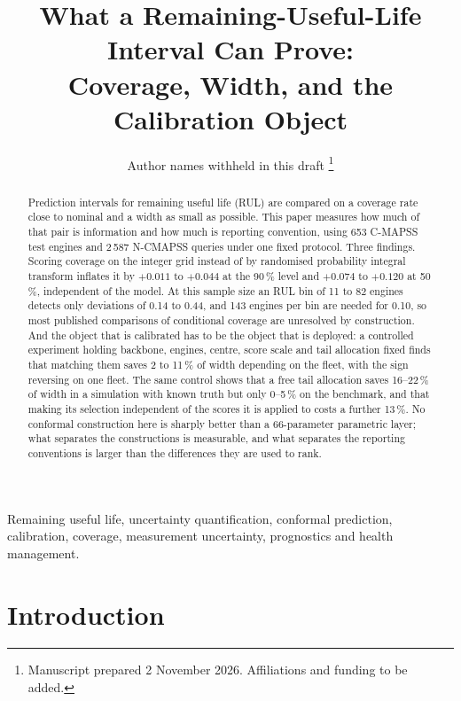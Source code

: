 \documentclass[journal]{IEEEtran}
\begin{document}
\title{What a Remaining-Useful-Life Interval Can Prove:\\ Coverage, Width, and the Calibration Object}

\author{Author names withheld in this draft%
\thanks{Manuscript prepared 2 November 2026. Affiliations and funding to be added.}}

\maketitle

\begin{abstract}
Prediction intervals for remaining useful life (RUL) are compared on a coverage rate close
to nominal and a width as small as possible. This paper measures how much of that pair is
information and how much is reporting convention, using 653 C-MAPSS test engines and 2\,587
N-CMAPSS queries under one fixed protocol. Three findings. Scoring coverage on the integer
grid instead of by randomised probability integral transform inflates it by $+0.011$ to
$+0.044$ at the 90\,\% level and $+0.074$ to $+0.120$ at 50\,\%, independent of the model.
At this sample size an RUL bin of 11 to 82 engines detects only deviations of 0.14 to 0.44,
and 143 engines per bin are needed for 0.10, so most published comparisons of conditional
coverage are unresolved by construction. And the object that is calibrated has to be the
object that is deployed: a controlled experiment holding backbone, engines, centre, score
scale and tail allocation fixed finds that matching them saves 2 to 11\,\% of width
depending on the fleet, with the sign reversing on one fleet. The same control shows that a
free tail allocation saves 16--22\,\% of width in a simulation with known truth but only
0--5\,\% on the benchmark, and that making its selection independent of the scores it is
applied to costs a further 13\,\%. No conformal construction here is sharply better than a
66-parameter parametric layer; what separates the constructions is measurable, and what
separates the reporting conventions is larger than the differences they are used to rank.
\end{abstract}

\begin{IEEEkeywords}
Remaining useful life, uncertainty quantification, conformal prediction, calibration,
coverage, measurement uncertainty, prognostics and health management.
\end{IEEEkeywords}

\section{Introduction}
\end{document}
